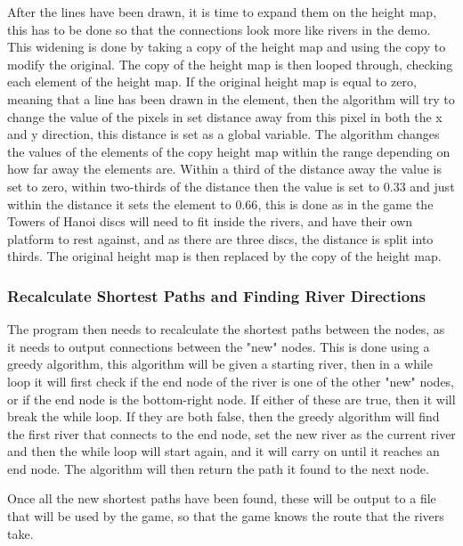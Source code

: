 	After the lines have been drawn, it is time to expand them on the height map, this has to be done so that the connections look more like rivers in the demo. This widening is done by taking a copy of the height map and using the copy to modify the original. The copy of the height map is then looped through, checking each element of the height map. If the original height map is equal to zero, meaning that a line has been drawn in the element, then the algorithm will try to change the value of the pixels in set distance away from this pixel in both the x and y direction, this distance is set as a global variable. The algorithm changes the values of the elements of the copy height map within the range depending on how far away the elements are. Within a third of the distance away the value is set to zero, within two-thirds of the distance then the value is set to $0.33$ and just within the distance it sets the element to $0.66$, this is done as in the game the Towers of Hanoi discs will need to fit inside the rivers, and have their own platform to rest against, and as there are three discs, the distance is split into thirds. The original height map is then replaced by the copy of the height map.
	\newline
	\par

\subsubsection{Recalculate Shortest Paths and Finding River Directions}

	The program then needs to recalculate the shortest paths between the nodes, as it needs to output connections between the "new" nodes. This is done using a greedy algorithm, this algorithm will be given a starting river, then in a while loop it will first check if the end node of the river is one of the other "new" nodes, or if the end node is the bottom-right node. If either of these are true, then it will break the while loop. If they are both false, then the greedy algorithm will find the first river that connects to the end node, set the new river as the current river and then the while loop will start again, and it will carry on until it reaches an end node. The algorithm will then return the path it found to the next node.
	\newline
	\par

	Once all the new shortest paths have been found, these will be output to a file that will be used by the game, so that the game knows the route that the rivers take.\\

